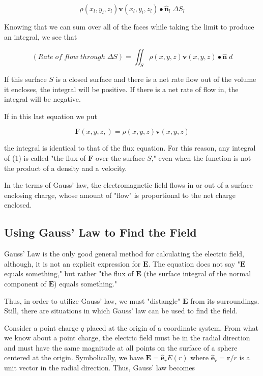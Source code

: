 \documentclass[11pt]{article}
\begin{document}
\begin{equation}
	\rho(x_l,y_l,z_l)\mathbf{v}(x_l,y_l,z_l) \bullet \mathbf{\hat{n}}_l \; \Delta S_l
\end{equation}

Knowing that we can sum over all of the faces while taking the limit to produce an integral, we see that

\begin{equation}
	(Rate \; of \; flow \; through \; \Delta S) = \iint_S \rho(x,y,z) \mathbf{v}(x,y,z) \bullet \mathbf{\hat{n}} \; d
\end{equation}

If this surface $S$ is a closed surface and there is a net rate flow out of the volume it encloses, the integral will be positive. If there is a net rate of flow in, the integral will be negative.

If in this last equation we put

\begin{equation}
	\mathbf{F}(x,y,z,) = \rho(x,y,z) \mathbf{v}(x,y,z)
\end{equation}

the integral is identical to that of the flux equation. For this reason, any integral of (1) is called "the flux of $\mathbf{F}$ over the surface $S$," even when the function is not the product of a density and a velocity.

In the terms of Gauss' law, the electromagnetic field flows in or out of a surface enclosing charge, whose amount of "flow" is proportional to the net charge enclosed.

\subsection{Using Gauss' Law to Find the Field}

Gauss' Law is the only good general method for calculating the electric field, although, it is not an explicit expression for $\mathbf{E}$. The equation does not say "$\mathbf{E}$ equals something," but rather "the flux of $\mathbf{E}$ (the surface integral of the normal component of $\mathbf{E}$) equals something."

Thus, in order to utilize Gauss' law, we must "distangle" $\mathbf{E}$ from its surroundings. Still, there are situations in which Gauss' law can be used to find the field.

Consider a point charge $q$ placed at the origin of a coordinate system. From what we know about a point charge, the electric field must be in the radial direction and must have the same magnitude at all points on the surface of a sphere centered at the origin. Symbolically, we have $\mathbf{E} = \mathbf{\hat{e}}_r E(r)$ where $\mathbf{\hat{e}}_r = \mathbf{r}/r$ is a unit vector in the radial direction. Thus, Gauss' law becomes
\end{document}
